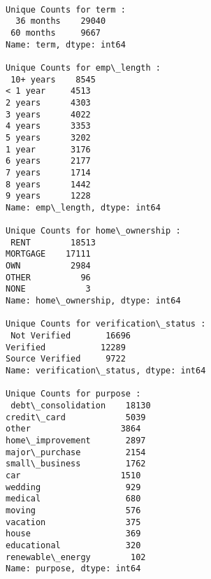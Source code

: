 \documentclass[11pt]{article}
\begin{document}
    \begin{Verbatim}[commandchars=\\\{\}]

Unique Counts for term :
  36 months    29040
 60 months     9667
Name: term, dtype: int64

Unique Counts for emp\_length :
 10+ years    8545
< 1 year     4513
2 years      4303
3 years      4022
4 years      3353
5 years      3202
1 year       3176
6 years      2177
7 years      1714
8 years      1442
9 years      1228
Name: emp\_length, dtype: int64

Unique Counts for home\_ownership :
 RENT        18513
MORTGAGE    17111
OWN          2984
OTHER          96
NONE            3
Name: home\_ownership, dtype: int64

Unique Counts for verification\_status :
 Not Verified       16696
Verified           12289
Source Verified     9722
Name: verification\_status, dtype: int64

Unique Counts for purpose :
 debt\_consolidation    18130
credit\_card            5039
other                  3864
home\_improvement       2897
major\_purchase         2154
small\_business         1762
car                    1510
wedding                 929
medical                 680
moving                  576
vacation                375
house                   369
educational             320
renewable\_energy        102
Name: purpose, dtype: int64


\end{Verbatim}
\end{document}
